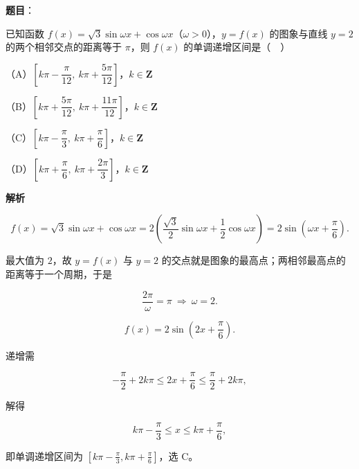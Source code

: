 \begin{answer}

\textbf{题目}：

已知函数 $f(x)=\sqrt3\sin\omega x+\cos\omega x$（$\omega>0$），$y=f(x)$ 的图象与直线 $y=2$ 的两个相邻交点的距离等于 $\pi$，则 $f(x)$ 的单调递增区间是（　）

（A）$\left[k\pi-\dfrac{\pi}{12},\ k\pi+\dfrac{5\pi}{12}\right]$，$k\in\mathbf Z$

（B）$\left[k\pi+\dfrac{5\pi}{12},\ k\pi+\dfrac{11\pi}{12}\right]$，$k\in\mathbf Z$

（C）$\left[k\pi-\dfrac{\pi}{3},\ k\pi+\dfrac{\pi}{6}\right]$，$k\in\mathbf Z$

（D）$\left[k\pi+\dfrac{\pi}{6},\ k\pi+\dfrac{2\pi}{3}\right]$，$k\in\mathbf Z$

\textbf{解析}

\nopagebreak[4]
\[f(x)=\sqrt3\sin\omega x+\cos\omega x
=2\left(\frac{\sqrt3}{2}\sin\omega x+\frac12\cos\omega x\right)
=2\sin\left(\omega x+\frac\pi6\right).\]

最大值为 $2$，故 $y=f(x)$ 与 $y=2$ 的交点就是图象的最高点；两相邻最高点的距离等于一个周期，于是

\nopagebreak[4]
\[\frac{2\pi}{\omega}=\pi\ \Longrightarrow\ \omega=2 .\]

\nopagebreak[4]
\[f(x)=2\sin\left(2x+\frac\pi6\right).\]

递增需

\nopagebreak[4]
\[-\frac\pi2+2k\pi\leqslant 2x+\frac\pi6\leqslant\frac\pi2+2k\pi,\]

解得

\nopagebreak[4]
\[k\pi-\frac\pi3\leqslant x\leqslant k\pi+\frac\pi6,\]

即单调递增区间为 $\left[k\pi-\frac{\pi}{3},k\pi+\frac{\pi}{6}\right]$，选 C。


\end{answer}

